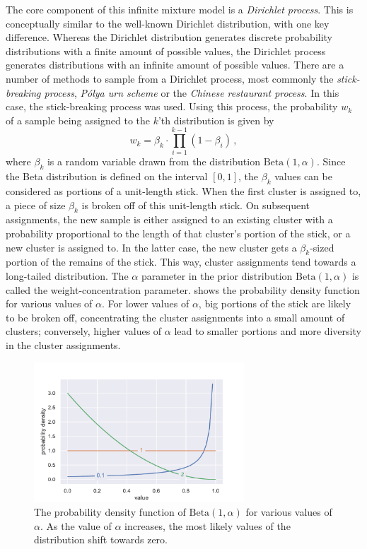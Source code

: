 The core component of this infinite mixture model is a \emph{Dirichlet
process}. This is conceptually similar to the well-known Dirichlet
distribution, with one key difference. Whereas the Dirichlet distribution
generates discrete probability distributions with a finite amount of possible
values, the Dirichlet process generates distributions with an infinite amount
of possible values. There are a number of methods to sample from a Dirichlet
process, most commonly the \emph{stick-breaking process}, \emph{P\'{o}lya urn
scheme} or the \emph{Chinese restaurant process}\citep{dirichlet}. In this
case, the stick-breaking process was used. Using this process, the probability
$w_k$ of a sample being assigned to the $k$'th distribution is given by
\begin{equation}
  w_k = \beta_k \cdot \prod_{i=1}^{k-1} (1 - \beta_i)\,,
\end{equation}
where $\beta_k$ is a random variable drawn from the distribution
$\mathrm{Beta}(1, \alpha)$. Since the Beta distribution is defined on the
interval $\left[0, 1\right]$, the $\beta_k$ values can be considered as
portions of a unit-length stick. When the first cluster is assigned to, a
piece of size $\beta_k$ is broken off of this unit-length stick. On subsequent
assignments, the new sample is either assigned to an existing cluster with a
probability proportional to the length of that cluster's portion of the stick,
or a new cluster is assigned to. In the latter case, the new cluster gets a
$\beta_k$-sized portion of the remains of the stick. This way, cluster
assignments tend towards a long-tailed distribution. The $\alpha$ parameter in
the prior distribution $\mathrm{Beta}(1, \alpha)$ is called the
weight-concentration parameter.  shows the probability
density function for various values of $\alpha$.
For lower values of $\alpha$, big portions of the stick are likely to be
broken off, concentrating the cluster assignments into a small amount of clusters;
conversely, higher values of $\alpha$ lead to smaller portions and more
diversity in the cluster assignments.

\begin{figure}[tb]
  \centering
  \includegraphics[width=0.7\textwidth]{figures/alpha.pdf}
  \caption{The probability density function of $\mathrm{Beta}(1, \alpha)$ for various
    values of $\alpha$. As the value of $\alpha$ increases, the most
    likely values of the distribution shift towards zero.\label{fig:alpha}}
\end{figure}

